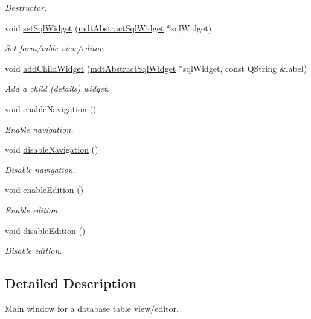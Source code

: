 \begin{DoxyCompactItemize}
\begin{DoxyCompactList}\small\item\em Destructor. \end{DoxyCompactList}\item 
void \hyperlink{classmdt_sql_window_ac9246abfa0ccb7c721ee233d5928230d}{setSqlWidget} (\hyperlink{classmdt_abstract_sql_widget}{mdtAbstractSqlWidget} $\ast$sqlWidget)
\begin{DoxyCompactList}\small\item\em Set form/table view/editor. \end{DoxyCompactList}\item 
void \hyperlink{classmdt_sql_window_a0a013aa6050823325c309c7241f0c4fe}{addChildWidget} (\hyperlink{classmdt_abstract_sql_widget}{mdtAbstractSqlWidget} $\ast$sqlWidget, const QString \&label)
\begin{DoxyCompactList}\small\item\em Add a child (details) widget. \end{DoxyCompactList}\item 
void \hyperlink{classmdt_sql_window_a6d4d853c8c64a99ff2e396b99ea63a87}{enableNavigation} ()
\begin{DoxyCompactList}\small\item\em Enable navigation. \end{DoxyCompactList}\item 
void \hyperlink{classmdt_sql_window_a961d587d63b0997a10db6728773a108f}{disableNavigation} ()
\begin{DoxyCompactList}\small\item\em Disable navigation. \end{DoxyCompactList}\item 
void \hyperlink{classmdt_sql_window_a42d1283a05eddd2a48af74cf764ef240}{enableEdition} ()
\begin{DoxyCompactList}\small\item\em Enable edition. \end{DoxyCompactList}\item 
void \hyperlink{classmdt_sql_window_a629fa57fcdde0e4db0fc93efd84c9123}{disableEdition} ()
\begin{DoxyCompactList}\small\item\em Disable edition. \end{DoxyCompactList}\end{DoxyCompactItemize}


\subsection{Detailed Description}
Main window for a database table view/editor. 

